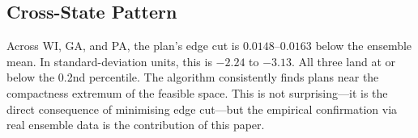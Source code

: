 \subsection{Cross-State Pattern}

Across WI, GA, and PA, the \ar{} plan's edge cut is $0.0148$--$0.0163$ below
the ensemble mean.  In standard-deviation units, this is $-2.24$ to $-3.13$.
All three land at or below the 0.2nd percentile.  The algorithm consistently
finds plans near the compactness extremum of the feasible space.  This is not
surprising---it is the direct consequence of minimising edge cut---but the
empirical confirmation via real ensemble data is the contribution of this paper.
